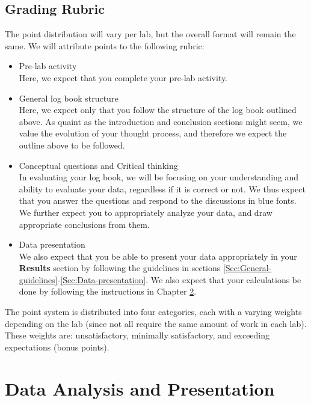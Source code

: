\documentclass[12pt]{report}
\begin{document}
\section{Grading Rubric}
The point distribution will vary per lab, but the overall format will remain the same. We will attribute points to the following rubric:
\begin{itemize}
\item Pre-lab activity \\
Here, we expect that you complete your pre-lab activity.

\item General log book structure \\
Here, we expect only that you follow the structure of the log book outlined above. As quaint as the introduction and conclusion sections might seem, we value the evolution of your thought process, and therefore we expect the outline above to be followed.

\item Conceptual questions and Critical thinking \\
In evaluating your log book, we will be focusing on your understanding and ability to evaluate your data, regardless if it is correct or not. {\color{blue} We thus expect that you answer the questions and respond to the discussions in blue fonts.}
We further expect you to appropriately analyze your data, and  draw appropriate conclusions from them.

\item Data presentation \\
We also expect that you be able to present your data appropriately in your \textbf{Results} section by following the guidelines in sections \ref{Sec:General-guidelines}-\ref{Sec:Data-presentation}. We also expect that your calculations be done  by following the instructions in Chapter \ref{Ch:Data-analysis}.

\end{itemize}

The point system is distributed into four categories, each with a varying weights depending on the lab (since not all require the same amount of work in each lab). These weights are: unsatisfactory, minimally satisfactory, and exceeding expectations (bonus points).


\chapter{Data Analysis and Presentation}
\label{Ch:Data-analysis}
\end{document}
